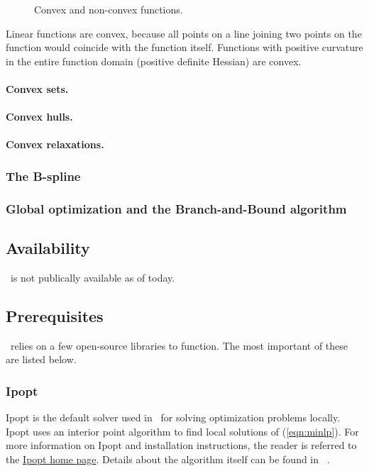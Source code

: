 \begin{figure}[H]
{	\label{fig:convex2}
}
\caption{Convex and non-convex functions.}
\label{fig:convex}
\end{figure}
Linear functions are convex, because all points on a line joining two points on the function would coincide with the function itself. Functions with positive curvature in the entire function domain (positive definite Hessian) are convex.

\paragraph{Convex sets.}
\paragraph{Convex hulls.}
\paragraph{Convex relaxations.}

\subsubsection{The B-spline} \label{sec:bspline}

\subsubsection{Global optimization and the Branch-and-Bound algorithm} \label{sec:global}

\subsection{Availability} \label{sec:availability}
\solvername\ is not publically available as of today.

\subsection{Prerequisites} \label{sec:prerequisites}
\solvername\ relies on a few open-source libraries to function. The most important of these are listed below.

\subsubsection{Ipopt} \label{sec:ipopt}
Ipopt is the default solver used in \solvername\ for solving optimization problems locally. Ipopt uses an interior point algorithm to find local solutions of (\ref{eqn:minlp}). For more information on Ipopt and installation instructions, the reader is referred to the {\color{blue} \href{https://projects.coin-or.org/Ipopt}{Ipopt home page}}. Details about the algorithm itself can be found in ~\cite{Wachter2006}.

